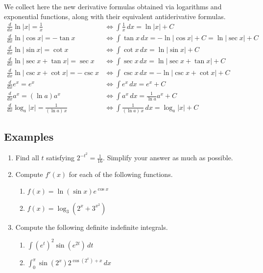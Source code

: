 \begin{namedtheorem} We collect here the new derivative formulas obtained via logarithms and exponential functions, along with their equivalent antiderivative formulas.
\begin{align*}
  \frac{d}{dx}\ln\vert x\vert=\frac{1}{x} & \iff \int\frac{1}{x} \, dx=\ln\vert x\vert+C \\
  \frac{d}{dx}\ln\vert \cos x \vert=-\tan x & \iff \int\tan x \, dx=-\ln\vert \cos x \vert+C=\ln\vert\sec x\vert+C \\
  \frac{d}{dx}\ln\vert \sin x\vert=\cot x & \iff \int\cot x \, dx=\ln\vert \sin x\vert+C \\
  \frac{d}{dx}\ln\vert \sec x+\tan x\vert=\sec x & \iff \int\sec x \, dx=\ln\vert \sec x+\tan x\vert+C \\
  \frac{d}{dx}\ln\vert \csc x+\cot x\vert=-\csc x & \iff \int\csc x \, dx=-\ln\vert \csc x+\cot x\vert+C\\
  \frac{d}{dx}e^x=e^x & \iff \int e^x \, dx=e^x+C\\
  \frac{d}{dx}a^x=(\ln a)a^x & \iff \int a^x \, dx=\frac{1}{\ln a}a^x+C\\
  \frac{d}{dx}\log_a \vert x\vert =\frac{1}{(\ln a)\, x} & \iff \int \frac{1}{(\ln a)\, x} \, dx=\log_a\vert x\vert+C
\end{align*}

\end{namedtheorem}




\subsection*{Examples}
\begin{enumerate}
  \item Find all $t$ satisfying $\displaystyle 2^{-t^2}=\frac{1}{16}$. Simplify your answer as much as possible.  
  \item Compute $f'(x)$ for each of the following functions.
  \begin{enumerate}
    \item $f(x)=\ln(\sin x)e^{\cos x}$
    \item $f(x)=\log_3(2^x+3^{x^2})$
  \end{enumerate}
  \item Compute the following definite indefinite integrals.
  \begin{enumerate}
    \item $\displaystyle\int (e^t)^2\sin(e^{2t})\, dt$
    \item $\displaystyle\int_0^\pi \sin(2^x)2^{\cos(2^x)+x}\, dx$
  \end{enumerate}
\end{enumerate}





